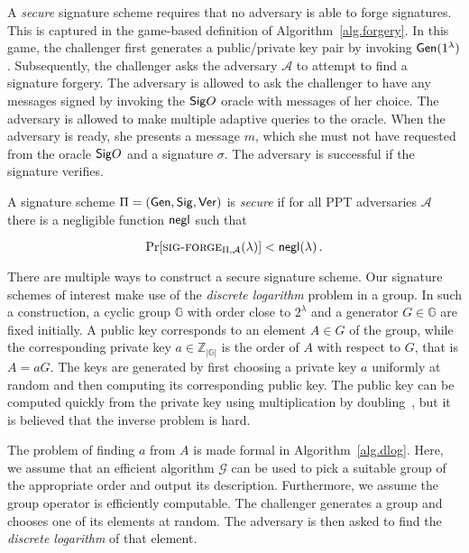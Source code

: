 A \emph{secure} signature scheme requires that no adversary is able to forge
signatures. This is captured in the game-based definition of Algorithm~\ref{alg.forgery}. In this game, the challenger first generates a public/private key pair by invoking $\mathsf{Gen}(1^\lambda)$. Subsequently, the challenger asks the adversary $\mathcal{A}$ to attempt to find a signature forgery. The adversary is allowed to ask the challenger to have any messages signed by invoking the ${\mathsf{Sig}}O$ oracle with messages of her choice. The adversary is allowed to make multiple adaptive queries to the oracle. When the adversary is ready, she presents a message $m$, which she must not have requested from the oracle ${\mathsf{Sig}}O$ and a signature $\sigma$. The adversary is successful if the signature verifies.



\begin{definition}[Security]
  A signature scheme $\Pi = (\mathsf{Gen}, \mathsf{Sig}, \mathsf{Ver})$ is \emph{secure} if for all PPT adversaries $\mathcal{A}$ there is a negligible function $\mathsf{negl}$ such that

  \[
  \Pr[\textsc{sig-forge}_{\Pi,\mathcal{A}}(\lambda)] < \mathsf{negl}(\lambda)\,.
  \]
\end{definition}

There are multiple ways to construct a secure signature scheme. Our signature schemes of interest make use of the \emph{discrete logarithm} problem in a group. In such a construction, a cyclic group $\mathbb{G}$ with order close to $2^\lambda$ and a generator $G \in \mathbb{G}$ are fixed initially. A public key corresponds to an element $A \in G$ of the group, while the corresponding private key $a \in \mathbb{Z}_{|\mathbb{G}|}$ is the order of $A$ with respect to $G$, that is $A = aG$. The keys are generated by first choosing a private key $a$ uniformly at random and then computing its corresponding public key. The public key can be computed quickly from the private key using multiplication by doubling~\cite{shoup}, but it is believed that the inverse problem is hard.

The problem of finding $a$ from $A$ is made formal in Algorithm~\ref{alg.dlog}. Here, we assume that an efficient algorithm $\mathcal{G}$ can be used to pick a suitable group of the appropriate order and output its description. Furthermore, we assume the group operator is efficiently computable. The challenger generates a group and chooses one of its elements at random. The adversary is then asked to find the \emph{discrete logarithm} of that element.


